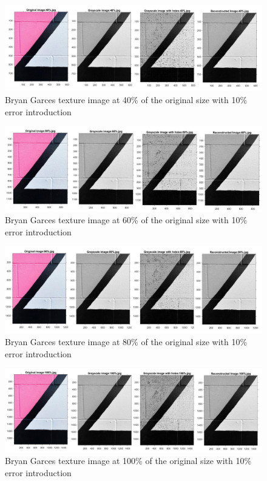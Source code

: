 \begin{figure}[!ht]
\center \includegraphics[scale=0.31]{BryanGarces40.jpg}
\caption{Bryan Garces texture image at 40\% of the original size with 10\% error introduction}
\label{fig:BryanGarces40}
\end{figure}

\begin{figure}[!ht]
\center \includegraphics[scale=0.31]{BryanGarces60.jpg}
\caption{Bryan Garces texture image at 60\% of the original size with 10\% error introduction}
\label{fig:BryanGarces60}
\end{figure}

\begin{figure}[!ht]
\center \includegraphics[scale=0.31]{BryanGarces80.jpg}
\caption{Bryan Garces texture image at 80\% of the original size with 10\% error introduction}
\label{fig:BryanGarces80}
\end{figure}

\begin{figure}[!ht]
\center \includegraphics[scale=0.31]{BryanGarces100.jpg}
\caption{Bryan Garces texture image at 100\% of the original size with 10\% error introduction}
\label{fig:BryanGarces100}
\end{figure}

